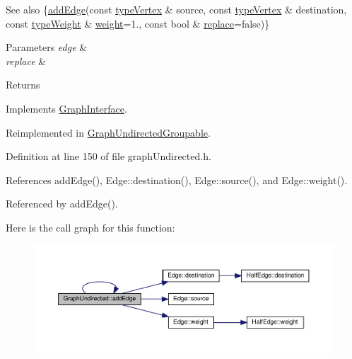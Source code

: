 \begin{DoxySeeAlso}{See also}
\{\hyperlink{classGraphUndirected_a2be69d987f3b4fa1cf547898d30b47d2}{add\+Edge}(const \hyperlink{edge_8h_a5fbd20c46956d479cb10afc9855223f6}{type\+Vertex} \& source, const \hyperlink{edge_8h_a5fbd20c46956d479cb10afc9855223f6}{type\+Vertex} \& destination, const \hyperlink{edge_8h_a2e7ea3be891ac8b52f749ec73fee6dd2}{type\+Weight} \& \hyperlink{classGraphUndirected_ae40d431c92d8b4884c7915c44d42f356}{weight}=1., const bool \& \hyperlink{classGraphUndirected_aee3bc279ffe39f8efb7dd60865279474}{replace}=false)\} 
\end{DoxySeeAlso}

\begin{DoxyParams}{Parameters}
{\em edge} & \\
\hline
{\em replace} & \\
\hline
\end{DoxyParams}
\begin{DoxyReturn}{Returns}

\end{DoxyReturn}


Implements \hyperlink{classGraphInterface_ae77357ec21f272f1e3fb4c93c5f99675}{Graph\+Interface}.



Reimplemented in \hyperlink{classGraphUndirectedGroupable_a2efe963916349ac6615721ab85a93ceb}{Graph\+Undirected\+Groupable}.



Definition at line 150 of file graph\+Undirected.\+h.



References add\+Edge(), Edge\+::destination(), Edge\+::source(), and Edge\+::weight().



Referenced by add\+Edge().

Here is the call graph for this function\+:\nopagebreak
\begin{figure}[H]
\begin{center}
\leavevmode
\includegraphics[width=350pt]{classGraphUndirected_a366c8b7dbf1cbfe408d5399ad64494dc_cgraph}
\end{center}
\end{figure}
\mbox{\label{classGraphUndirected_acc533831ee3234a03a1cc0037b017a83}} 

